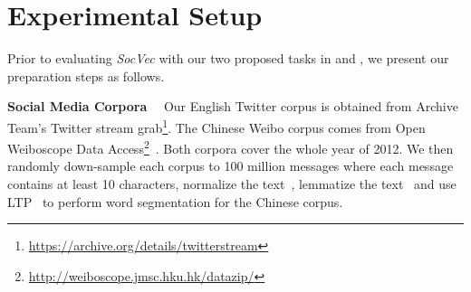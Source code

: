 %

\section{Experimental Setup}
\label{sec:prelim}
Prior to evaluating \textit{SocVec} with our two proposed tasks in  and , we present our preparation steps as follows. 

\textbf{Social Media Corpora}~~
Our English Twitter corpus is obtained from Archive Team's Twitter stream 
grab\footnote{\scriptsize{\url{https://archive.org/details/twitterstream}}}.
The Chinese Weibo corpus comes from Open Weiboscope Data Access\footnote{\scriptsize{\url{http://weiboscope.jmsc.hku.hk/datazip/}}}~\cite{fu2013assessing}.
Both corpora cover the whole year of {2012}.
We then randomly down-sample each corpus to 100 million messages where
each message contains at least 10 characters, normalize the text~\cite{han2012automatically}, 
lemmatize the text~\cite{manning2014stanford} and use LTP~\cite{che2010ltp} to perform word segmentation for the Chinese corpus.

